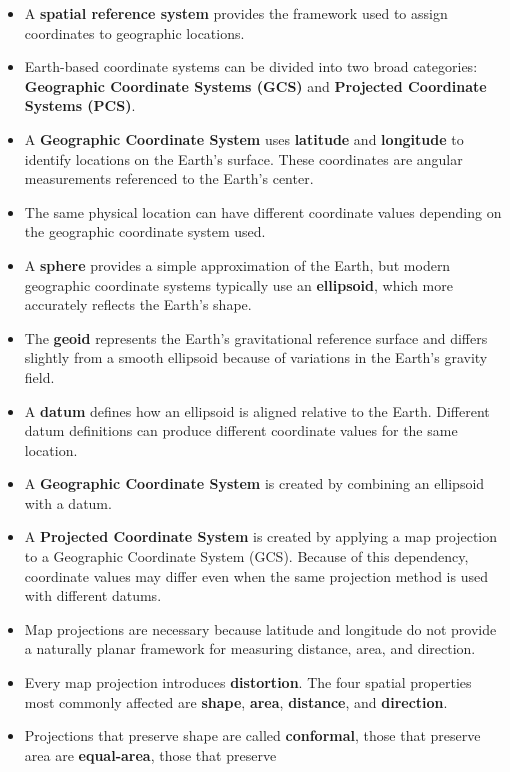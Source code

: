 \documentclass[
  letterpaper,
]{book}
\begin{document}
\begin{itemize}
\item
  A \textbf{spatial reference system} provides the framework used to
  assign coordinates to geographic locations.
\item
  Earth-based coordinate systems can be divided into two broad
  categories: \textbf{Geographic Coordinate Systems (GCS)} and
  \textbf{Projected Coordinate Systems (PCS)}.
\item
  A \textbf{Geographic Coordinate System} uses \textbf{latitude} and
  \textbf{longitude} to identify locations on the Earth's surface. These
  coordinates are angular measurements referenced to the Earth's center.
\item
  The same physical location can have different coordinate values
  depending on the geographic coordinate system used.
\item
  A \textbf{sphere} provides a simple approximation of the Earth, but
  modern geographic coordinate systems typically use an
  \textbf{ellipsoid}, which more accurately reflects the Earth's shape.
\item
  The \textbf{geoid} represents the Earth's gravitational reference
  surface and differs slightly from a smooth ellipsoid because of
  variations in the Earth's gravity field.
\item
  A \textbf{datum} defines how an ellipsoid is aligned relative to the
  Earth. Different datum definitions can produce different coordinate
  values for the same location.
\item
  A \textbf{Geographic Coordinate System} is created by combining an
  ellipsoid with a datum.
\item
  A \textbf{Projected Coordinate System} is created by applying a map
  projection to a Geographic Coordinate System (GCS). Because of this
  dependency, coordinate values may differ even when the same projection
  method is used with different datums.
\item
  Map projections are necessary because latitude and longitude do not
  provide a naturally planar framework for measuring distance, area, and
  direction.
\item
  Every map projection introduces \textbf{distortion}. The four spatial
  properties most commonly affected are \textbf{shape}, \textbf{area},
  \textbf{distance}, and \textbf{direction}.
\item
  Projections that preserve shape are called \textbf{conformal}, those
  that preserve area are \textbf{equal-area}, those that preserve

\end{itemize}
\end{document}
